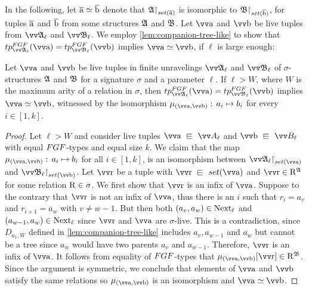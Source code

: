 In the following, let $\overline{\mathrm{a}} \simeq \overline{\mathrm{b}}$ denote that $\restr{\str{A}}{\set(\elemtuplea)}$ is isomorphic to $\restr{\str{B}}{\set(\elemtupleb)}$, for tuples $\overline{\mathrm{a}}$ and $\overline{\mathrm{b}}$ from some structures ${\mathfrak{A}}$ and ${\mathfrak{B}}$.
Let $\elemtuptuplea$ and $\elemtuptupleb$ be live tuples from $\unravel{A}_{\ell}$ and $\unravel{B}_{\ell}$.
We employ \cref{lem:companion-tree-like} to show that $\tp{\FGF}{\unravel{A}_{\ell}}{\elemtuptuplea} = \tp{\FGF}{\unravel{B}_{\ell}}{\elemtuptupleb}$ implies $\elemtuptuplea \simeq \elemtuptupleb$, if $\ell$ is large enough:
\begin{lemma}\label{lem:fgf-type-iso}
  Let $\elemtuptuplea$ and $\elemtuptupleb$ be live tuples in finite unravelings $\unravel{A}_{\ell}$ and $\unravel{B}_{\ell}$ of $\sigma$-structures ${\mathfrak{A}}$ and ${\mathfrak{B}}$ for a signature $\sigma$ and a parameter $\ell$.
  If $\ell > W$, where $W$ is the maximum arity of a relation in $\sigma$, then $\tp{\FGF}{\unravel{A}_{\ell}}{\elemtuptuplea} = \tp{\FGF}{\unravel{B}_{\ell}}{\elemtuptupleb}$ implies $\elemtuptuplea \simeq \elemtuptupleb$, witnessed by the isomorphism $\mu_{(\elemtuptuplea, \elemtuptupleb)}:\, a_{i} \mapsto b_{i}$ for every $i \in [1, k]$.
\end{lemma}
\begin{proof}
Let $\ell > W$ and consider live tuples $\elemtuptuplea \sqin \unraveldom{A}_{\ell}$ and $\elemtuptupleb \sqin \unraveldom{B}_{\ell}$ with equal $\FGF$-types and equal size $k$.
We claim that the map $\mu_{(\elemtuptuplea, \elemtuptupleb)}:\, a_{i} \mapsto b_{i}$ for all $i \in [1, k]$, is an isomorphism between $\restr{\str{\unravel{A}_{\ell}}}{\set(\elemtuptuplea)}$ and $\restr{\str{\unravel{B}_{\ell}}}{\set(\elemtuptupleb)}$.
Let $\elemtuptupler$ be a tuple with $\elemtuptupler \sqin \set(\elemtuptuplea)$ and $\elemtuptupler \in \relR^{\str{A}}$ for some relation $\mathrm{R} \in \sigma$.
We first show that $\elemtuptupler$ is an infix of $\elemtuptuplea$.
Suppose to the contrary that $\elemtuptupler$ is not an infix of $\elemtuptuplea$, thus there is an $i$ such that $r_{i} = a_{v}$ and $r_{i+1} = a_{w}$ with $v \ne w - 1$.
But then both $(a_{v}, a_{w}) \in \mathrm{Next}_{\ell}$ and $(a_{w-1}, a_{w}) \in \mathrm{Next}_{\ell}$ since $\elemtuptupler$ and $\elemtuptuplea$ are $\sigma$-live.
This is a contradiction, since $D_{a_{1}, W}$ defined in \cref{lem:companion-tree-like} includes $a_{v}, a_{w-1}$ and $a_{w}$ but cannot be a tree since $a_{w}$ would have two parents $a_{v}$ and $a_{w-1}$.
Therefore, $\elemtuptupler$ is an infix of $\elemtuptuplea$.
It follows from equality of $\FGF$-types that $\mu_{(\elemtuptuplea, \elemtuptupleb)}[\elemtuptupler] \in \relR^{\str{B}}$.
Since the argument is symmetric, we conclude that elements of $\elemtuptuplea$ and $\elemtuptupleb$ satisfy the same relations so $\mu_{(\elemtuptuplea, \elemtuptupleb)}$ is an isomorphism and $\elemtuptuplea \simeq \elemtuptupleb$.
\end{proof}

